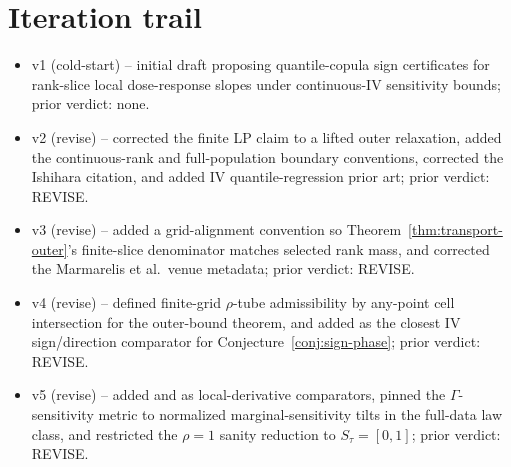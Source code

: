 \documentclass[11pt]{article}
\theoremstyle{definition}
\theoremstyle{plain}
\theoremstyle{remark}
\begin{document}
\section{Iteration trail}
\begin{itemize}[leftmargin=2em]
\item v1 (cold-start) -- initial draft proposing quantile-copula sign certificates for rank-slice local dose-response slopes under continuous-IV sensitivity bounds; prior verdict: none.
\item v2 (revise) -- corrected the finite LP claim to a lifted outer relaxation, added the continuous-rank and full-population boundary conventions, corrected the Ishihara citation, and added IV quantile-regression prior art; prior verdict: REVISE.
\item v3 (revise) -- added a grid-alignment convention so Theorem~\ref{thm:transport-outer}'s finite-slice denominator matches selected rank mass, and corrected the Marmarelis et al.\ venue metadata; prior verdict: REVISE.
\item v4 (revise) -- defined finite-grid \(\rho\)-tube admissibility by any-point cell intersection for the outer-bound theorem, and added \citet{Kline2016} as the closest IV sign/direction comparator for Conjecture~\ref{conj:sign-phase}; prior verdict: REVISE.
\item v5 (revise) -- added \citet{Chesher2003} and \citet{Jun2009} as local-derivative comparators, pinned the \(\Gamma\)-sensitivity metric to normalized marginal-sensitivity tilts in the full-data law class, and restricted the \(\rho=1\) sanity reduction to \(S_\tau=[0,1]\); prior verdict: REVISE.
\end{itemize}
\end{document}
